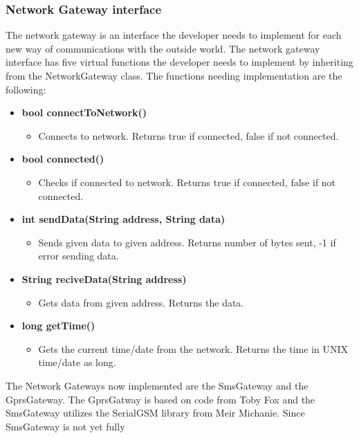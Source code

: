 \subsubsection{Network Gateway interface}
The network gateway is an interface the developer needs to implement for each new way 
of communications with the outside world. The network gateway interface has five virtual 
functions the developer needs to implement by inheriting from the NetworkGateway class.
The functions needing implementation are the following:
\begin{itemize}
    \item \textbf{bool connectToNetwork()}
        \begin{itemize}
            \item Connects to network. Returns true if connected, false if not
                  connected.
        \end{itemize}
    \item \textbf{bool connected()}
        \begin{itemize}
            \item Checks if connected to network. Returns true if connected, false
                  if not connected.
        \end{itemize}
    \item \textbf{int sendData(String address, String data)}
        \begin{itemize}
            \item Sends given data to given address. Returns number of bytes sent, -1 if 
                  error sending data.
        \end{itemize}
    \item \textbf{String reciveData(String address)}
        \begin{itemize}
            \item Gets data from given address. Returns the data.
        \end{itemize}
     \item \textbf{long getTime()}
        \begin{itemize}
            \item Gets the current time/date from the network. Returns the time in UNIX time/date as long.
        \end{itemize}
\end{itemize}
The Network Gateways now implemented are the SmsGateway and the GprsGateway. The 
GprsGatway is based on code from Toby Fox\cite{tobek} and the SmsGateway utilizes the
SerialGSM library from Meir Michanie\cite{meirm}. Since SmsGateway is not yet fully
